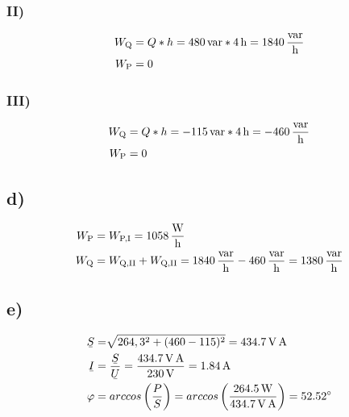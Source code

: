 \documentclass[../../document.tex]{subfiles}
\begin{document}
\subsubsection*{II)}

\begin{equation*}
    \begin{split}
        W_{\textrm{Q}} &= Q * h = \SI{480}{var} * \SI{4}{\hour} = \SI{1840}{\frac{var}{\hour}}\\
        W_{\textrm{P}} &= 0\\
    \end{split}
\end{equation*}

\subsubsection*{III)}

\begin{equation*}
    \begin{split}
        W_{\textrm{Q}} &= Q * h = \SI{-115}{var} * \SI{4}{\hour} = \SI{-460}{\frac{var}{\hour}}\\
        W_{\textrm{P}} &= 0\\
    \end{split}
\end{equation*}

\subsection*{d)}

\begin{equation*}
    \begin{split}
        W_{\textrm{P}} &= W_{\textrm{P,I}} = \SI{1058}{\frac{\watt}{\hour}} \\
        W_{\textrm{Q}} &= W_{\textrm{Q,II}} + W_{\textrm{Q,II}} = \SI{1840}{\frac{var}{\hour}} - \SI{460}{\frac{var}{\hour}} = \SI{1380}{\frac{var}{\hour}}
    \end{split}
\end{equation*}

\subsection*{e)}

\begin{equation*}
    \begin{split}
        \ubar{S} &= \sqrt[]{264,3^2 + (460 - 115)^2} = \SI{434,7}{\volt\ampere}\\
        \ubar{I} &= \frac{\ubar{S}}{\ubar{U}} = \frac{\SI{434,7}{\volt\ampere}}{\SI{230}{\volt}} = \SI{1,84}{\ampere}\\
        \varphi &= arccos\left(\frac{P}{S}\right) = arccos\left(\frac{\SI{264,5}{\watt}}{\SI{434,7}{\volt\ampere}}\right) = \SI{52,52}{\degree}\\
    \end{split}
\end{equation*}
\end{document}
